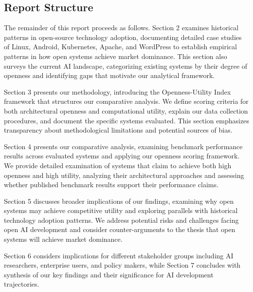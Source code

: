 \subsection{Report Structure}

The remainder of this report proceeds as follows. Section 2 examines historical patterns in open-source technology adoption, documenting detailed case studies of Linux, Android, Kubernetes, Apache, and WordPress to establish empirical patterns in how open systems achieve market dominance. This section also surveys the current AI landscape, categorizing existing systems by their degree of openness and identifying gaps that motivate our analytical framework.

Section 3 presents our methodology, introducing the Openness-Utility Index framework that structures our comparative analysis. We define scoring criteria for both architectural openness and computational utility, explain our data collection procedures, and document the specific systems evaluated. This section emphasizes transparency about methodological limitations and potential sources of bias.

Section 4 presents our comparative analysis, examining benchmark performance results across evaluated systems and applying our openness scoring framework. We provide detailed examination of systems that claim to achieve both high openness and high utility, analyzing their architectural approaches and assessing whether published benchmark results support their performance claims.

Section 5 discusses broader implications of our findings, examining why open systems may achieve competitive utility and exploring parallels with historical technology adoption patterns. We address potential risks and challenges facing open AI development and consider counter-arguments to the thesis that open systems will achieve market dominance.

Section 6 considers implications for different stakeholder groups including AI researchers, enterprise users, and policy makers, while Section 7 concludes with synthesis of our key findings and their significance for AI development trajectories.
